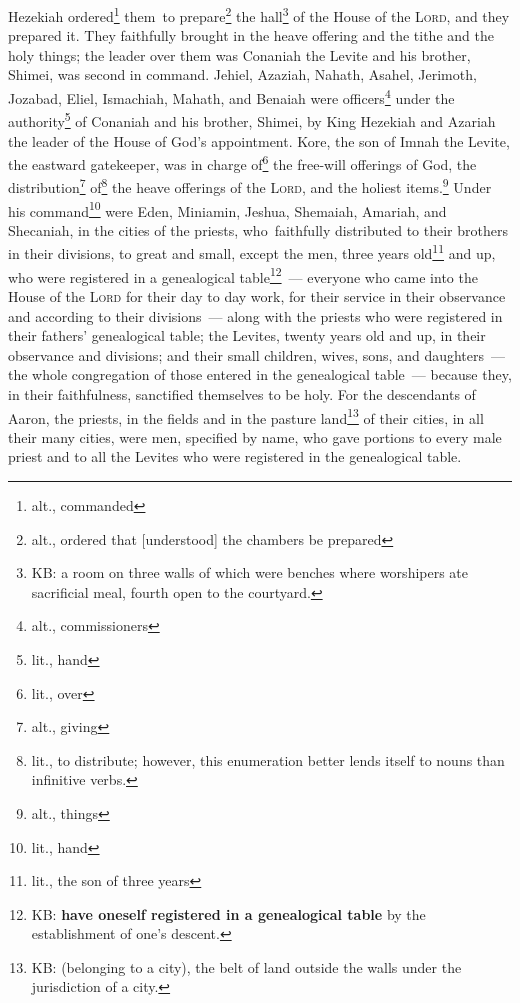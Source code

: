 \begin{inparaenum}
     Hezekiah ordered\footnote{alt., commanded} them\understood\ to prepare\footnote{alt., ordered that [understood] the chambers be prepared} the hall\footnote{KB: a room on three walls of which were benches where worshipers ate sacrificial meal, fourth open to the courtyard.} of the House of the \textsc{Lord}, and they prepared it.\understood%
     They faithfully brought in the heave offering and the tithe and the holy things; the leader over them was Conaniah the Levite and his brother, Shimei, was second in command.\understood%
     Jehiel, Azaziah, Nahath, Asahel, Jerimoth, Jozabad, Eliel, Ismachiah, Mahath, and Benaiah were officers\footnote{alt., commissioners} under the authority\footnote{lit., hand} of Conaniah and his brother, Shimei, by King Hezekiah and Azariah the leader of the House of God's appointment.%
     Kore, the son of Imnah the Levite, the eastward gatekeeper, was in charge of\footnote{lit., over} the free-will offerings of God, the distribution\footnote{alt., giving} of\footnote{lit., to distribute; however, this enumeration better lends itself to nouns than infinitive verbs.} the heave offerings of the \textsc{Lord}, and the holiest items.\footnote{alt., things}%
     Under his command\footnote{lit., hand} were Eden, Miniamin, Jeshua, Shemaiah, Amariah, and Shecaniah, in the cities of the priests, who\understood\ faithfully distributed to their brothers in their divisions, to great and small,%
     except the men, three years old\footnote{lit., the son of three years} and up, who were registered in a genealogical table\footnote{KB: \textbf{have oneself registered in a genealogical table} by the establishment of one's descent.}~--- everyone who came into the House of the \textsc{Lord} for their day to day work, for their service in their observance and according to their divisions~---%
     along with the priests who were registered in their fathers' genealogical table; the Levites, twenty years old and up, in their observance and divisions;%
     and their small children, wives, sons, and daughters~--- the whole congregation of those entered in the genealogical table~--- because they, in their faithfulness, sanctified themselves to be holy.%
     For the descendants of Aaron, the priests, in the fields and in the pasture land\footnote{KB: (belonging to a city), the belt of land outside the walls under the jurisdiction of a city.} of their cities, in all their many cities, were men, specified by name, who gave portions to every male priest and to all the Levites who were registered in the genealogical table.%
\end{inparaenum}
